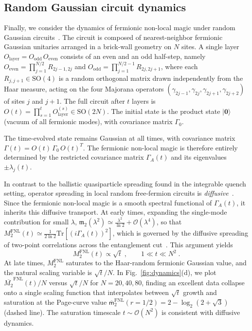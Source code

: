 \documentclass[prx,twocolumn,superscriptaddress,aps,10pt, frontmatterverbose, reprint,footinbib,longbibliography=true]{revtex4-2}
\begin{document}
\subsection{Random Gaussian circuit dynamics}
Finally, we consider the dynamics of fermionic non-local magic under random Gaussian circuits~\cite{tirrito2025magicphasetransitionsmonitored}.
The circuit is composed of nearest-neighbor fermionic Gaussian unitaries arranged in a brick-wall geometry on $N$ sites.
A single layer $O_{\mathrm{layer}} = O_{\mathrm{odd}}\,O_{\mathrm{even}}$ consists of an even and an odd half-step, namely $O_{\mathrm{even}} = \prod_{j=1}^{N/2} R_{2j-1,2j}$ and $O_{\mathrm{odd}} = \prod_{j=1}^{N/2-1} R_{2j,2j+1}$, where each $R_{j,j+1} \in \mathrm{SO}(4)$ is a random orthogonal matrix drawn independently from the Haar measure, acting on the four Majorana operators $(\gamma_{2j-1}, \gamma_{2j}, \gamma_{2j+1}, \gamma_{2j+2})$ of sites $j$ and $j+1$.
The full circuit after $t$ layers is $O(t) = \prod_{s=1}^t O_{\mathrm{layer}}^{(s)} \in \mathrm{SO}(2N)$.
The initial state is the product state $|\mathbf{0}\rangle$ (vacuum of all fermionic modes), with covariance matrix $\Gamma_0$. 

The time-evolved state remains Gaussian at all times, with covariance matrix $\Gamma(t) = O(t)\,\Gamma_0\,O(t)^T$.
The fermionic non-local magic is therefore entirely determined by the restricted covariance matrix $\Gamma_A(t)$ and its eigenvalues $\pm\lambda_j(t)$.

In contrast to the ballistic quasiparticle spreading found in the integrable quench setting, operator spreading in local random free-fermion circuits is \emph{diffusive}~\cite{dias2021diffusiveoperatorspreadingrandom,swann}.
Since the fermionic non-local magic is a smooth spectral functional of $\Gamma_A(t)$, it inherits this diffusive transport.
At early times, expanding the single-mode contribution for small $\lambda$, $\mathfrak{m}_2(\lambda^2) \simeq \frac{\lambda^2}{\ln 2} + \mathcal{O}(\lambda^4)$, so that $M_2^{\mathrm{FNL}}(t) \simeq \frac{1}{2\ln 2}\mathrm{Tr}[(i\Gamma_A(t))^2]$, which is governed by the diffusive spreading of two-point correlations across the entanglement cut~\cite{dias2021diffusiveoperatorspreadingrandom}.
This argument yields
\begin{equation}
    M_2^{\mathrm{FNL}}(t) \propto \sqrt{t}\;, \qquad 1 \ll t \ll N^2\;.
\end{equation}
At late times, $M_2^{\mathrm{FNL}}$ saturates to the Haar-random fermionic Gaussian value, and the natural scaling variable is $\sqrt{t}/N$.
In Fig.~\ref{fig:dynamics}(d), we plot $\overline{M_2}^{\mathrm{FNL}}(t)/N$ versus $\sqrt{t}/N$ for $N = 20, 40, 80$, finding an excellent data collapse onto a single scaling function that interpolates between $\sqrt{t}$ growth and saturation at the Page-curve value $\overline{\mathsf{m}}_{2}^{\mathrm{FNL}}(r=1/2)=2-\log_2(2+\sqrt{3})$  (dashed line).
The saturation timescale $t\sim\mathcal{O}(N^2)$ is consistent with diffusive dynamics.
\end{document}
